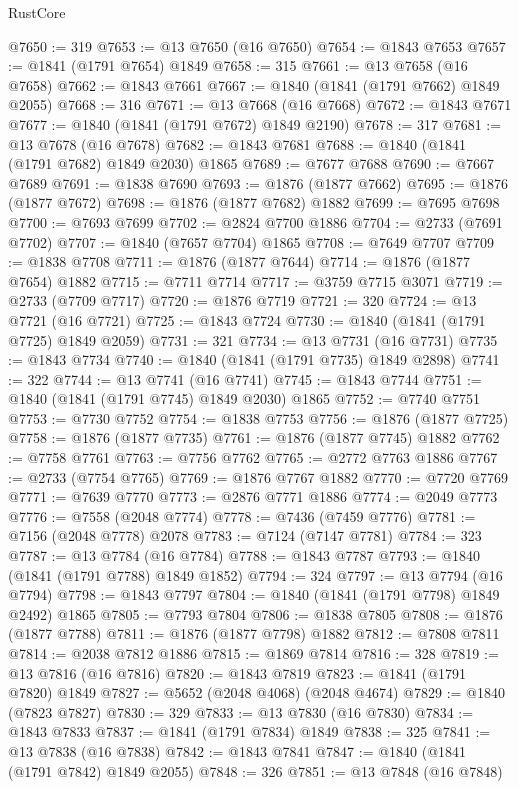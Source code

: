 \begin{lexlean}{RustCore}
\begin{coremodule}
@7650 := 319
@7653 := @13 @7650 (@16 @7650)
@7654 := @1843 @7653
@7657 := @1841 (@1791 @7654) @1849
@7658 := 315
@7661 := @13 @7658 (@16 @7658)
@7662 := @1843 @7661
@7667 := @1840 (@1841 (@1791 @7662) @1849 @2055)
@7668 := 316
@7671 := @13 @7668 (@16 @7668)
@7672 := @1843 @7671
@7677 := @1840 (@1841 (@1791 @7672) @1849 @2190)
@7678 := 317
@7681 := @13 @7678 (@16 @7678)
@7682 := @1843 @7681
@7688 := @1840 (@1841 (@1791 @7682) @1849 @2030) @1865
@7689 := @7677 @7688
@7690 := @7667 @7689
@7691 := @1838 @7690
@7693 := @1876 (@1877 @7662)
@7695 := @1876 (@1877 @7672)
@7698 := @1876 (@1877 @7682) @1882
@7699 := @7695 @7698
@7700 := @7693 @7699
@7702 := @2824 @7700 @1886
@7704 := @2733 (@7691 @7702)
@7707 := @1840 (@7657 @7704) @1865
@7708 := @7649 @7707
@7709 := @1838 @7708
@7711 := @1876 (@1877 @7644)
@7714 := @1876 (@1877 @7654) @1882
@7715 := @7711 @7714
@7717 := @3759 @7715 @3071
@7719 := @2733 (@7709 @7717)
@7720 := @1876 @7719
@7721 := 320
@7724 := @13 @7721 (@16 @7721)
@7725 := @1843 @7724
@7730 := @1840 (@1841 (@1791 @7725) @1849 @2059)
@7731 := 321
@7734 := @13 @7731 (@16 @7731)
@7735 := @1843 @7734
@7740 := @1840 (@1841 (@1791 @7735) @1849 @2898)
@7741 := 322
@7744 := @13 @7741 (@16 @7741)
@7745 := @1843 @7744
@7751 := @1840 (@1841 (@1791 @7745) @1849 @2030) @1865
@7752 := @7740 @7751
@7753 := @7730 @7752
@7754 := @1838 @7753
@7756 := @1876 (@1877 @7725)
@7758 := @1876 (@1877 @7735)
@7761 := @1876 (@1877 @7745) @1882
@7762 := @7758 @7761
@7763 := @7756 @7762
@7765 := @2772 @7763 @1886
@7767 := @2733 (@7754 @7765)
@7769 := @1876 @7767 @1882
@7770 := @7720 @7769
@7771 := @7639 @7770
@7773 := @2876 @7771 @1886
@7774 := @2049 @7773
@7776 := @7558 (@2048 @7774)
@7778 := @7436 (@7459 @7776)
@7781 := @7156 (@2048 @7778) @2078
@7783 := @7124 (@7147 @7781)
@7784 := 323
@7787 := @13 @7784 (@16 @7784)
@7788 := @1843 @7787
@7793 := @1840 (@1841 (@1791 @7788) @1849 @1852)
@7794 := 324
@7797 := @13 @7794 (@16 @7794)
@7798 := @1843 @7797
@7804 := @1840 (@1841 (@1791 @7798) @1849 @2492) @1865
@7805 := @7793 @7804
@7806 := @1838 @7805
@7808 := @1876 (@1877 @7788)
@7811 := @1876 (@1877 @7798) @1882
@7812 := @7808 @7811
@7814 := @2038 @7812 @1886
@7815 := @1869 @7814
@7816 := 328
@7819 := @13 @7816 (@16 @7816)
@7820 := @1843 @7819
@7823 := @1841 (@1791 @7820) @1849
@7827 := @5652 (@2048 @4068) (@2048 @4674)
@7829 := @1840 (@7823 @7827)
@7830 := 329
@7833 := @13 @7830 (@16 @7830)
@7834 := @1843 @7833
@7837 := @1841 (@1791 @7834) @1849
@7838 := 325
@7841 := @13 @7838 (@16 @7838)
@7842 := @1843 @7841
@7847 := @1840 (@1841 (@1791 @7842) @1849 @2055)
@7848 := 326
@7851 := @13 @7848 (@16 @7848)

\end{coremodule}
\end{lexlean}
